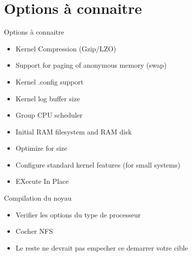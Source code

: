 \section{Options à connaitre}
\begin{frame}[fragile=singleslide]{Options à connaitre}
  \begin{itemize}
  \item Kernel Compression (Gzip/LZO)
  \item Support for paging of anonymous memory (swap)
  \item Kernel .config support
  \item Kernel log buffer size
  \item Group CPU scheduler
  \item Initial RAM filesystem and RAM disk
  \item Optimize for size
  \item Configure standard kernel features (for small systems)
  \item EXecute In Place
  \end{itemize}
\end{frame}

\begin{frame}[fragile=singleslide]{Compilation du noyau}
  \begin{itemize}
  \item Verifier les options du type de processeur
  \item Cocher NFS
  \item Le reste ne devrait pas empecher ce demarrer votre cible
  \end{itemize}  
\end{frame} 

